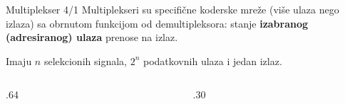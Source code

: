 \begin{frame}[t,label=03-s013]{Multiplekser 4/1}
\setlength{\parskip}{0pt}
Multiplekseri su specifične koderske mreže (više ulaza nego izlaza) sa obrnutom
funkcijom od demultipleksora: stanje \textbf{izabranog (adresiranog) ulaza} prenose na izlaz.
\par\vspace{1mm}
Imaju \textcolor{DEisticanje}{\(n\) selekcionih signala, \(2^n\) podatkovnih ulaza i jedan izlaz}.
\begingroup
\def\DEjedinica{.85cm}\def\DEvisina{.50cm}\def\DEdekmod{0}\def\DEcs{0}\def\DEprimer{0}\def\DEoblik{.62}
\begin{columns}[c,onlytextwidth]
\begin{column}{.64\textwidth}\centering

\end{column}
\begin{column}{.30\textwidth}\centering

\end{column}
\end{columns}
\endgroup
\end{frame}
